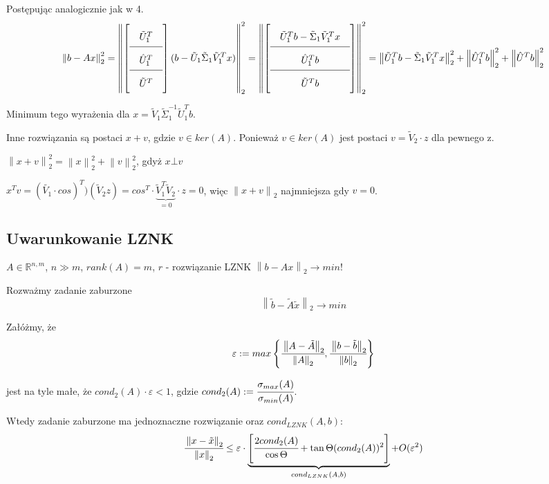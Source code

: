 \documentclass[hidelinks,a4paper,fleqn,oneside]{book}
\newcommand{\RR}{\mathbb{R}}
\newcommand{\ra}{\rightarrow}
\newcommand{\norm}[1]{\left\lVert#1\right\rVert}
\begin{document}
Postępując analogicznie jak w 4.
\[\arraycolsep=1em\def\arraystretch{2}
\norm{b - Ax}_2^2 = \norm{\left[ \begin{array}{c}
\tilde{U}_1^T \\ \hline
\hat{U}_1^T \\ \hline
\tilde{U}^T 
\end{array}\right] (b - \tilde{U}_1 \tilde{\Sigma}_1 \tilde{V}_1^Tx)}_2^2 = \norm{\left[\begin{array}{c}
\tilde{U}_1^Tb - \tilde{\Sigma}_1\tilde{V}_1^Tx \\ \hline
\hat{U}_1^T b\\ \hline
\tilde{U}^T b 
\end{array}\right]}_2^2 = 
\norm{\tilde{U}_1^Tb - \tilde{\Sigma}_1\tilde{V}_1^Tx}_2^2 +  \norm{\hat{U}_1^Tb}_2^2 + \norm{\hat{U}^Tb}_2^2
\]

Minimum tego wyrażenia dla $x = \tilde{V}_1\tilde{\Sigma}_1^{-1} \tilde{U}_1^Tb$.

Inne rozwiązania są postaci $x+v$, gdzie $v \in ker(A)$. Ponieważ $v \in ker(A)$ jest postaci $v = \tilde{V}_2 \cdot z$ dla pewnego z.

$\norm{x + v}_2^2 = \norm{x}_2^2 + \norm{v}_2^2$, gdyż $x \bot v$

$x^Tv = (\tilde{V_1} \cdot cos)^T) (\tilde{V}_2z) = cos^T \cdot \underbrace{\tilde{V}_1^T\tilde{V}_2}_{=0}\cdot z = 0$, więc $\norm{x + v}_2$ najmniejsza gdy $v = 0$.

\subsection{Uwarunkowanie LZNK}
$A \in \RR^{n,m}$, $n \gg m$, $rank(A) = m$, $r$ - rozwiązanie LZNK $\norm{b - Ax}_2 \ra min!$

Rozważmy zadanie zaburzone
\[\norm{\tilde{b} - \tilde{A}\tilde{x}}_2 \ra min\]

Załóżmy, że
\[
	\varepsilon := max \left\{ \cfrac{\norm{A - \tilde{A}}_2}{\norm{A} _2}, \cfrac{\norm{b - \tilde{b}}_2}{\norm{b}_2} \right\}
\]

jest na tyle małe, że $cond_2(A) \cdot \varepsilon < 1$, gdzie $cond_2(A) := \cfrac{\sigma_{max}(A)}{\sigma_{min}(A)}$.

Wtedy zadanie zaburzone ma jednoznaczne rozwiązanie oraz $cond_{LZNK}(A, b)$:
\[
	\cfrac{\norm{x - \tilde{x}}_2}{\norm{x}_2} \leq \varepsilon \cdot \underbrace{\left[ \cfrac{2 cond_2(A)}{\cos{\Theta}} + \tan{\Theta}(cond_2(A))^2 \right]}_{cond_{LZNK}(A, b)} + O(\varepsilon^2)
\]
\end{document}
